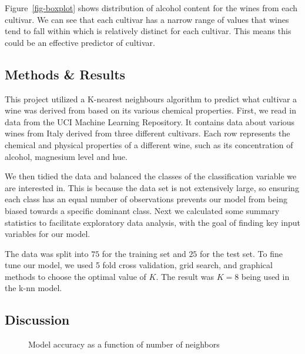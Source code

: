 \documentclass[
  letterpaper,
  DIV=11,
  numbers=noendperiod]{scrartcl}
\begin{document}
Figure~\ref{fig-boxplot} shows distribution of alcohol content for the
wines from each cultivar. We can see that each cultivar has a narrow
range of values that wines tend to fall within which is relatively
distinct for each cultivar. This means this could be an effective
predictor of cultivar.

\subsection{Methods \& Results}\label{methods-results}

This project utilized a K-nearest neighbours algorithm to predict what
cultivar a wine was derived from based on its various chemical
properties. First, we read in data from the UCI Machine Learning
Repository. It contains data about various wines from Italy derived from
three different cultivars. Each row represents the chemical and physical
properties of a different wine, such as its concentration of alcohol,
magnesium level and hue.

We then tidied the data and balanced the classes of the classification
variable we are interested in. This is because the data set is not
extensively large, so ensuring each class has an equal number of
observations prevents our model from being biased towards a specific
dominant class. Next we calculated some summary statistics to facilitate
exploratory data analysis, with the goal of finding key input variables
for our model.

The data was split into \(75%
\) for the training set and \(25%
\) for the test set. To fine tune our model, we used 5 fold cross
validation, grid search, and graphical methods to choose the optimal
value of \(K\). The result was \(K = 8\) being used in the k-nn model.

\subsection{Discussion}\label{discussion}

\begin{figure}


\caption{\label{fig-accuracy-plot}Model accuracy as a function of number
of neighbors}

\end{figure}%
\end{document}
